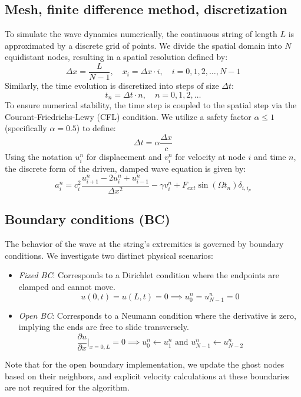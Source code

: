 \documentclass[a4paper,11pt]{article}
\begin{document}
\subsection{Mesh, finite difference method, discretization}
To simulate the wave dynamics numerically, the continuous string of length $L$ is approximated by a discrete grid of points. We divide the spatial domain into $N$ equidistant nodes, resulting in a spatial resolution defined by:
\begin{equation}
    \Delta x = \frac{L}{N-1}, \quad x_i = \Delta x \cdot i, \quad i = 0, 1, 2, \dots, N-1
\end{equation}
Similarly, the time evolution is discretized into steps of size $\Delta t$:
\begin{equation}
    t_n = \Delta t \cdot n, \quad n = 0, 1, 2, \dots
\end{equation}
To ensure numerical stability, the time step is coupled to the spatial step via the Courant-Friedrichs-Lewy (CFL) condition. We utilize a safety factor $\alpha \le 1$ (specifically $\alpha = 0.5$) to define:
\begin{equation}
    \Delta t = \alpha \frac{\Delta x}{c}
\end{equation}
Using the notation $u_i^n$ for displacement and $v_i^n$ for velocity at node $i$ and time $n$, the discrete form of the driven, damped wave equation is given by:
\begin{equation}
    a_i^n = c_i^2 \frac{u_{i+1}^n - 2u_i^n + u_{i-1}^n}{\Delta x^2} - \gamma v_i^n + F_{ext} \sin(\Omega t_n)\delta_{i,i_p}
\end{equation}

\subsection{Boundary conditions (BC)}
The behavior of the wave at the string's extremities is governed by boundary conditions. We investigate two distinct physical scenarios:
\begin{itemize}
    \item \textit{Fixed BC}: Corresponds to a Dirichlet condition where the endpoints are clamped and cannot move.
    \begin{equation}
        u(0, t) = u(L, t) = 0 \implies u_0^n = u_{N-1}^n = 0
    \end{equation}
    \item \textit{Open BC}: Corresponds to a Neumann condition where the derivative is zero, implying the ends are free to slide transversely.
    \begin{equation}
        \frac{\partial u}{\partial x}\bigg|_{x=0,L} = 0 \implies u_0^n \leftarrow u_1^n \text{ and } u_{N-1}^n \leftarrow u_{N-2}^n
    \end{equation}
\end{itemize}
Note that for the open boundary implementation, we update the ghost nodes based on their neighbors, and explicit velocity calculations at these boundaries are not required for the algorithm.
\end{document}
